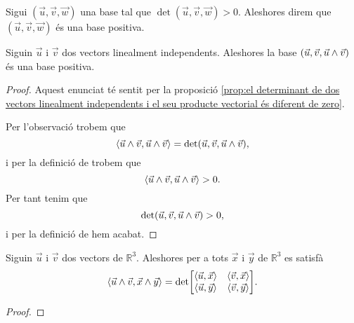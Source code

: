 \documentclass[../Apunts.tex]{subfiles}
\begin{document}
	\begin{definition}
		\label{orientació d'una base}
		\label{def:base positiva}
		Sigui \((\vec{u},\vec{v},\vec{w})\) una base tal que \(\det(\vec{u},\vec{v},\vec{w})>0\). Aleshores direm que \((\vec{u},\vec{v},\vec{w})\) és una base positiva.
	\end{definition}
	\begin{proposition}
		\label{prop:dos vectors linealment independents i el seu producte vectorial formen una base positiva}
		Siguin \(\vec{u}\) i \(\vec{v}\) dos vectors linealment independents. Aleshores la base \((\vec{u},\vec{v},\vec{u}\mathbin{\wedge}\vec{v})\) és una base positiva.
		\begin{proof}
			Aquest enunciat té sentit per la proposició \ref{prop:el determinant de dos vectors linealment independents i el seu producte vectorial és diferent de zero}.
			
			Per l'observació  trobem que
			\[\prodesc{\vec{u}\prodvec\vec{v}}{\vec{u}\prodvec\vec{v}}=\det(\vec{u},\vec{v},\vec{u}\prodvec\vec{v}),\]
			i per la definició de  trobem que
			\[\prodesc{\vec{u}\prodvec\vec{v}}{\vec{u}\prodvec\vec{v}}>0.\]
			Per tant tenim que
			\[\det(\vec{u},\vec{v},\vec{u}\mathbin{\wedge}\vec{v})>0,\]
			i per la definició de  hem acabat.
		\end{proof}
	\end{proposition}
	\begin{proposition}
		\label{prop:fórmula de Lagrange}
		Siguin \(\vec{u}\) i \(\vec{v}\) dos vectors de \(\mathbb{R}^{3}\). Aleshores per a tots \(\vec{x}\) i \(\vec{y}\) de \(\mathbb{R}^{3}\) es satisfà
		\[\prodesc{\vec{u}\prodvec\vec{v}}{\vec{x}\prodvec\vec{y}}=\det\left[\begin{matrix}
			\prodesc{\vec{u}}{\vec{x}} & \prodesc{\vec{v}}{\vec{x}} \\
			\prodesc{\vec{u}}{\vec{y}} & \prodesc{\vec{v}}{\vec{y}}
		\end{matrix}\right].\]
		\begin{proof}
		\end{proof}
	\end{proposition}
\end{document}

